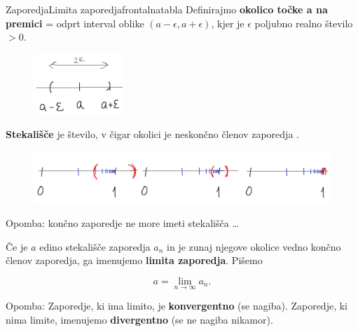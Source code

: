 \begin{priprava}{}{}{Zaporedja}{Limita zaporedja}{frontalna}{tabla}
Definirajmo \textbf{okolico točke a na premici} = odprt interval oblike $ (a - \epsilon, a + \epsilon) $, kjer je $\epsilon$ poljubno realno število $ > 0 $.

\begin{figure}[h]
    \centering
    \includegraphics[width=0.3\textwidth]{slike/e_okolica.png}
\end{figure}

\textbf{Stekališče} je število, v čigar okolici  je neskončno členov zaporedja .

\begin{figure}[h]
    \centering
    \includegraphics[width=\textwidth]{slike/e_okolica_primer.png}
\end{figure}

\newpage

Opomba: končno zaporedje ne more imeti stekališča \ldots

Če je $ a $ edino stekališče zaporedja $ a_n $ in je zunaj njegove okolice vedno končno členov zaporedja, ga imenujemo \textbf{limita zaporedja}. Pišemo 

$$ a = \lim_{n \rightarrow \infty} a_n .$$


Opomba: Zaporedje, ki ima limito, je \textbf{konvergentno} (se nagiba). Zaporedje, ki nima limite, imenujemo \textbf{divergentno} (se ne nagiba nikamor).


\end{priprava}
